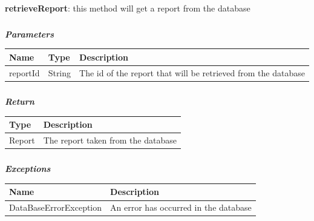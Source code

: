 						\paragraph{}
							\textbf{retrieveReport}: this method will get a report from the database
							\subparagraph{}
							\textit{\textbf{Parameters}}
							\vspace{-2mm}
								\begin{table}[!h]
									\begin{tabular}{L{0.15\textwidth}L{0.15\textwidth}L{0.5\textwidth}}
										\toprule
										\textbf{Name} & \textbf{Type} & Description \\
										\midrule
								  		reportId & String & The id of the report that will be retrieved from the database \\
								 		\bottomrule
									\end{tabular}
								\end{table}
							\vspace{-6mm}
							\subparagraph{}
								\textit{\textbf{Return}}
								\vspace{-2mm}
									\begin{table}[!h]
									\begin{tabular}{L{0.2\textwidth}L{0.6\textwidth}}
										\toprule
										Type & Description \\
										\midrule
								  	Report & The report taken from the database \\
								 		\bottomrule
									\end{tabular}
								\end{table}
							\vspace{-6mm}
							\subparagraph{}
								\textit{\textbf{Exceptions}}
								\vspace{-2mm}
									\begin{table}[!h]
									\begin{tabular}{ll}
										\toprule
										\textbf{Name} & \textbf{Description} \\
										\midrule
								  		DataBaseErrorException & An error has occurred in the database \\ 
								 		\bottomrule
									\end{tabular}
								\end{table}
						

